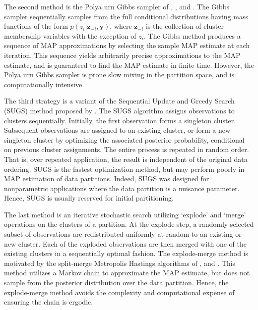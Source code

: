 \documentclass[article, nojss]{jss}
\newcommand{\bz}{\boldsymbol{z}}
\newcommand{\by}{\boldsymbol{y}}
\begin{document}
The second method is the Polya urn Gibbs sampler of \citet{MacEachern1994}, \citet{BushMacEachern1996}, and \citet{MacEachernMuller1998}. The Gibbs sampler sequentially samples from the full conditional distributions having mass functions of the form $p(z_i|\bz_{-i},\by)$, where $\bz_{-i}$ is the collection of cluster membership variables with the exception of $z_i$. The Gibbs method produces a sequence of MAP approximations by selecting the sample MAP estimate at each iteration. This sequence yields arbitrarily precise approximations to the MAP estimate, and is guaranteed to find the MAP estimate in finite time. However, the Polya urn Gibbs sampler is prone slow mixing in the partition space, and is computationally intensive.

The third strategy is a variant of the Sequential Update and Greedy Search (SUGS) method proposed by \citet{WangDunson2010}. The SUGS algorithm assigns observations to clusters sequentially. Initially, the first observation forms a singleton cluster. Subsequent observations are assigned to an existing cluster, or form a new singleton cluster by optimizing the associated posterior probability, conditional on previous cluster assignments. The entire process is repeated in random order. That is, over repeated application, the result is independent of the original data ordering. SUGS is the fastest optimization method, but may perform poorly in MAP estimation of data partitions. Indeed, SUGS was designed for nonparametric applications where the data partition is a nuisance parameter. Hence, SUGS is usually reserved for initial partitioning.

The last method is an iterative stochastic search utilizing `explode' and `merge' operations on the clusters of a partition. At the explode step, a randomly selected subset of observations are redistributed uniformly at random to an existing or new cluster. Each of the exploded observations are then merged with one of the existing clusters in a sequentially optimal fashion. The explode-merge method is motivated by the split-merge Metropolis Hastings algorithms of \citet{GreenRichardson2001}, and \citet{JainNeal2004, JainNeal2007}. This method utilizes a Markov chain to approximate the MAP estimate, but does not sample from the posterior distribution over the data partition. Hence, the explode-merge method avoids the complexity and computational expense of ensuring the chain is ergodic. 
\end{document}
